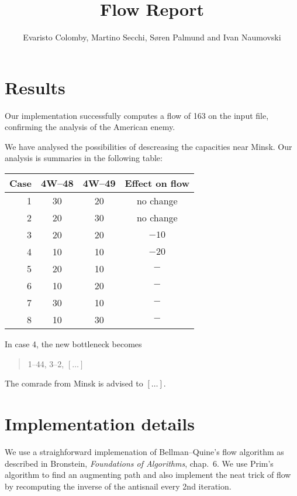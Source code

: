 \documentclass{tufte-handout}
\title{Flow Report}
\author{Evaristo Colomby, Martino Secchi, Søren Palmund and Ivan Naumovski}
\begin{document}
	\maketitle
  \section{Results}

  Our implementation successfully computes a flow of 163 on the input file, confirming the analysis of the American enemy.

  We have analysed the possibilities of descreasing the capacities near Minsk.
  Our analysis is summaries in the following table:

\bigskip
  \begin{tabular}{rccc}\toprule
    Case & 4W--48	& 4W--49	& Effect on flow	\\\midrule
    1		& 30			& 20			& no change 		\\
    2		& 20 			& 30 			& no change 		\\
    3		& 20			& 20			& $-10$ 			\\
    4		& 10			& 10			& $-20$				\\
    5		& 20			& 10			& $-$				\\
    6		& 10			& 20			& $-$				\\
    7		& 30			& 10			& $-$				\\
    8		& 10			& 30			& $-$				\\\bottomrule
  \end{tabular}
  \bigskip

  In case 4, the new bottleneck becomes
  \begin{quote}
      1--44, 3--2, $[\ldots]$
  \end{quote}
  The comrade from Minsk is advised to $[\ldots]$.

  \section{Implementation details}

  We use a straighforward implemenation of Bellman--Quine's flow algorithm as described in Bronstein, \emph{Foundations of Algorithms}, chap.~6.
  We use Prim's algorithm to find an augmenting path and also implement the neat trick of flow by recomputing the inverse of the antisnail every 2nd iteration.
\end{document}
